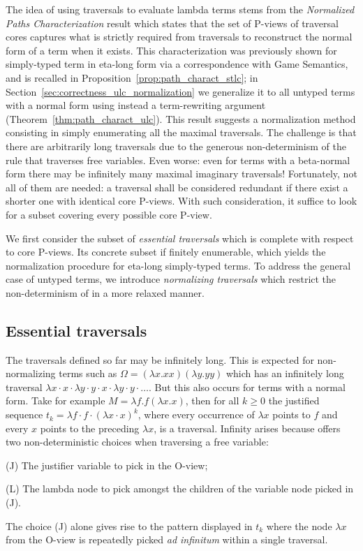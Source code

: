 \documentclass{elsarticle}
\theoremstyle{plain}
\theoremstyle{definition}
\begin{document}
The idea of using traversals to evaluate lambda terms stems from the \emph{Normalized Paths Characterization} result which states that the set of P-views of traversal cores captures what is strictly required from traversals to reconstruct the normal form of a term when it exists.
This characterization was previously shown for simply-typed term in eta-long form via
a correspondence with Game Semantics,
 and is recalled in Proposition~\ref{prop:path_charact_stlc};
 in Section~\ref{sec:correctness_ulc_normalization} we generalize it to all untyped terms with a normal form using instead a term-rewriting argument (Theorem~\ref{thm:path_charact_ulc}).
This result suggests a normalization method consisting in simply enumerating all the maximal traversals.
The challenge is that there are arbitrarily long traversals due to the generous non-determinism of the rule  that traverses free variables.
Even worse: even for terms with a beta-normal form
there may be infinitely many maximal imaginary traversals!
Fortunately, not all of them are needed: a traversal shall be considered redundant if there exist a shorter one with identical core P-views.
With such consideration, it suffice to look for a subset covering every possible core P-view.

We first consider the subset of \emph{essential traversals} which is complete with respect to core P-views.
Its concrete subset if finitely enumerable, which yields the normalization procedure for eta-long simply-typed terms.
To address the general case of untyped terms,
we introduce \emph{normalizing traversals} which restrict the non-determinism of  in a more relaxed manner.

\subsection{Essential traversals}

The traversals defined so far may be infinitely long. This is expected for non-normalizing terms such as $\Omega = (\lambda x. x x)(\lambda y. y y)$ which has an infinitely long traversal $\lambda x \cdot x \cdot \lambda y \cdot y \cdot x \cdot \lambda y \cdot y \cdot \ldots$. But this also occurs for terms with a normal form. Take for example $M = \lambda f . f (\lambda x. x)$, then for all $k\geq0$ the justified sequence $t_k = \lambda f \cdot f \cdot (\lambda x \cdot  x)^k$, where every occurrence of $\lambda x$ points to $f$ and every $x$ points to the preceding $\lambda x$, is a traversal.
Infinity arises because  offers two non-deterministic choices when traversing a free variable:
\begin{compactitem}
\item[(J)] The justifier variable to pick in the O-view;
\item[(L)] The lambda node to pick amongst the children of the variable node picked in (J).
\end{compactitem}
The choice (J) alone gives rise to the pattern displayed in $t_k$ where the node $\lambda x$ from the O-view is repeatedly picked {\it ad infinitum} within a single traversal.
\end{document}
